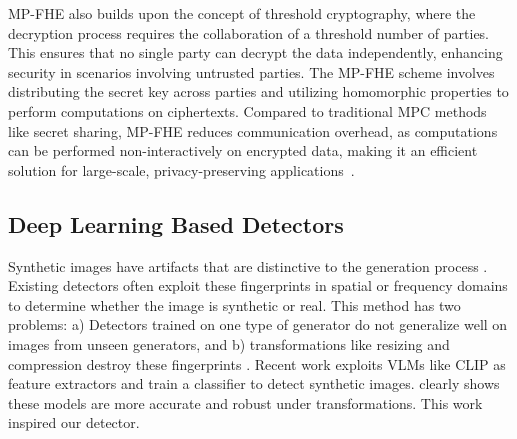 MP-FHE also builds upon the concept of threshold cryptography, where the decryption process requires the collaboration of a threshold number of parties. This ensures that no single party can decrypt the data independently, enhancing security in scenarios involving untrusted parties. The MP-FHE scheme involves distributing the secret key across parties and utilizing homomorphic properties to perform computations on ciphertexts. Compared to traditional MPC methods like secret sharing, MP-FHE reduces communication overhead, as computations can be performed non-interactively on encrypted data, making it an efficient solution for large-scale, privacy-preserving applications~\cite{mouchet2021multiparty, lee2023efficient}.

\subsection{Deep Learning Based Detectors}

Synthetic images have artifacts that are distinctive to the generation process \cite{marra2019DoGAN, yu2019attributing}. Existing detectors often exploit these fingerprints in spatial \cite{sinitsa2023deep,liu2022detecting,cozzolino2018forensictransfer, marra2019incremental, du2020towards, jeon2020tgd} or frequency \cite{durall2020watch, frank2020leveraging, dzanic2020Fourier} domains to determine whether the image is synthetic or real. This method has two problems: a) Detectors trained on one type of generator do not generalize well on images from unseen generators, and b) transformations like resizing and compression destroy these fingerprints \cite{corvi2023detection}. Recent work exploits VLMs like CLIP \cite{radford2021learning} as feature extractors \cite{sha2023fake, amoroso2023parents, ojha2023towards,cozzolino2024raising} and train a classifier to detect synthetic images. \citet{cozzolino2024raising} clearly shows these models are more accurate and robust under transformations. This work inspired our detector.